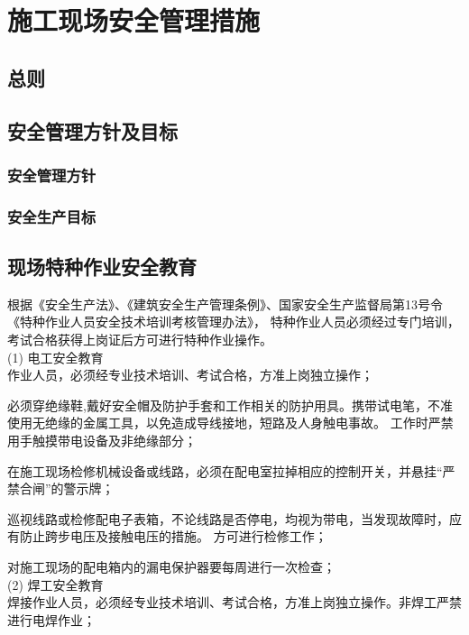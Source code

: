 \section{施工现场安全管理措施}
\subsection{总则}

\subsection{安全管理方针及目标}
\subsubsection{安全管理方针}

\subsubsection{安全生产目标}

\subsection{现场特种作业安全教育}

根据《安全生产法》、《建筑安全生产管理条例》、国家安全生产监督局第13号令《特种作业人员安全技术培训考核管理办法》，
特种作业人员必须经过专门培训，考试合格获得上岗证后方可进行特种作业操作。\\

(1) 电工安全教育\\

 作业人员，必须经专业技术培训、考试合格，方准上岗独立操作；

 必须穿绝缘鞋,戴好安全帽及防护手套和工作相关的防护用具。携带试电笔，不准使用无绝缘的金属工具，以免造成导线接地，短路及人身触电事故。
工作时严禁用手触摸带电设备及非绝缘部分；

 在施工现场检修机械设备或线路，必须在配电室拉掉相应的控制开关，并悬挂“严禁合闸”的警示牌；

 巡视线路或检修配电子表箱，不论线路是否停电，均视为带电，当发现故障时，应有防止跨步电压及接触电压的措施。
方可进行检修工作；

 对施工现场的配电箱内的漏电保护器要每周进行一次检查；\\


(2) 焊工安全教育\\

 焊接作业人员，必须经专业技术培训、考试合格，方准上岗独立操作。非焊工严禁进行电焊作业；

